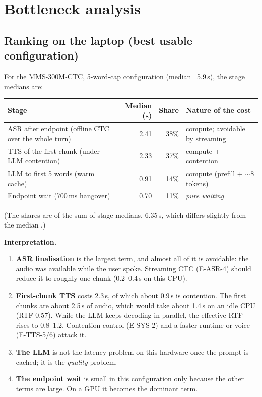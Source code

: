 \section{Bottleneck analysis}
\label{sec:bottlenecks}

\subsection{Ranking on the laptop (best usable configuration)}
For the MMS-300M-CTC, 5-word-cap configuration (median \ttfa\ 5.9\,s), the stage medians are:

\begin{center}\small
\begin{tabularx}{\textwidth}{@{}L{6.2cm}rrY@{}}
\toprule
\textbf{Stage} & \textbf{Median (s)} & \textbf{Share} & \textbf{Nature of the cost} \\
\midrule
ASR after endpoint (offline CTC over the whole turn) & 2.41 & 38\% & compute; avoidable by streaming \\
TTS of the first chunk (under LLM contention) & 2.33 & 37\% & compute + contention \\
LLM to first 5 words (warm cache) & 0.91 & 14\% & compute (prefill + $\sim$8 tokens) \\
Endpoint wait (700\,ms hangover) & 0.70 & 11\% & \emph{pure waiting} \\
\bottomrule
\end{tabularx}
\end{center}
(The shares are of the sum of stage medians, 6.35\,s, which differs slightly from the median \ttfa.)

\textbf{Interpretation.}
\begin{enumerate}
  \item \textbf{ASR finalisation} is the largest term, and almost all of it is avoidable: the audio was
  available while the user spoke. Streaming CTC (E-ASR-4) should reduce it to roughly one chunk
  (0.2--0.4\,s on this CPU\proj).
  \item \textbf{First-chunk TTS} costs 2.3\,s, of which about 0.9\,s is contention. The first chunks are
  about 2.5\,s of audio, which would take about 1.4\,s on an idle CPU (RTF 0.57). While the LLM keeps
  decoding in parallel, the effective RTF rises to 0.8--1.2\meas. Contention control (E-SYS-2) and a
  faster runtime or voice (E-TTS-5/6) attack it.
  \item \textbf{The LLM} is not the latency problem on this hardware once the prompt is cached; it is the
  \emph{quality} problem.
  \item \textbf{The endpoint wait} is small in this configuration only because the other terms are large. On a
  GPU it becomes the dominant term.
\end{enumerate}


